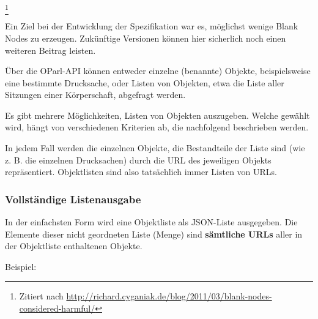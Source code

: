 \documentclass[,a4paper]{article}
\begin{document}
\footnote{Zitiert nach
  \url{http://richard.cyganiak.de/blog/2011/03/blank-nodes-considered-harmful/}}

Ein Ziel bei der Entwicklung der Spezifikation war es, möglichst wenige
Blank Nodes zu erzeugen. Zukünftige Versionen können hier sicherlich
noch einen weiteren Beitrag leisten.


Über die OParl-API können entweder einzelne (benannte) Objekte,
beispielsweise eine bestimmte Drucksache, oder Listen von Objekten, etwa
die Liste aller Sitzungen einer Körperschaft, abgefragt werden.

Es gibt mehrere Möglichkeiten, Listen von Objekten auszugeben. Welche
gewählt wird, hängt von verschiedenen Kriterien ab, die nachfolgend
beschrieben werden.

In jedem Fall werden die einzelnen Objekte, die Bestandteile der Liste
sind (wie z. B. die einzelnen Drucksachen) durch die URL des jeweiligen
Objekts repräsentiert. Objektlisten sind also tatsächlich immer Listen
von URLs.

\subsubsection{Vollständige
Listenausgabe}\label{vollstuxe4ndige-listenausgabe}

In der einfachsten Form wird eine Objektliste als JSON-Liste ausgegeben.
Die Elemente dieser nicht geordneten Liste (Menge) sind
\textbf{sämtliche URLs} aller in der Objektliste enthaltenen Objekte.

Beispiel:
\end{document}
